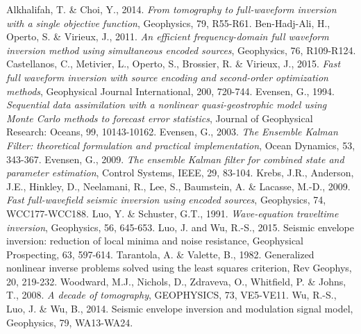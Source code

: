 \documentclass[mreferee]{gji}
\begin{document}
\begin{thebibliography}{}
   Alkhalifah, T. \& Choi, Y., 2014. \textit{From tomography to full-waveform inversion with a single objective function}, Geophysics, 79, R55-R61.
   Ben-Hadj-Ali, H., Operto, S. \& Virieux, J., 2011. \textit{An efficient frequency-domain full waveform inversion method using simultaneous encoded sources}, Geophysics, 76, R109-R124.
    Castellanos, C., Metivier, L., Operto, S., Brossier, R. \& Virieux, J., 2015. \textit{Fast full waveform inversion with source encoding and second-order optimization methods}, Geophysical Journal International, 200, 720-744. 
    Evensen, G., 1994. \textit{Sequential data assimilation with a nonlinear quasi-geostrophic model using Monte Carlo methods to forecast error statistics}, Journal of Geophysical Research: Oceans, 99, 10143-10162.
   Evensen, G., 2003. \textit{The Ensemble Kalman Filter: theoretical formulation and practical implementation}, Ocean Dynamics, 53, 343-367.
   Evensen, G., 2009. \textit{The ensemble Kalman filter for combined state and parameter estimation}, Control Systems, IEEE, 29, 83-104.
   Krebs, J.R., Anderson, J.E., Hinkley, D., Neelamani, R., Lee, S., Baumstein, A. \& Lacasse, M.-D., 2009. \textit{Fast full-wavefield seismic inversion using encoded sources}, Geophysics, 74, WCC177-WCC188.
   Luo, Y. \& Schuster, G.T., 1991. \textit{Wave-equation traveltime inversion}, Geophysics, 56, 645-653.
 Luo, J. and Wu, R.-S., 2015. Seismic envelope inversion: reduction of local minima and noise resistance, Geophysical Prospecting, 63, 597-614.
 Tarantola, A. \& Valette, B., 1982. Generalized nonlinear inverse problems solved using the least squares criterion, Rev Geophys, 20, 219-232.
 Woodward, M.J., Nichols, D., Zdraveva, O., Whitfield, P. \& Johns, T., 2008. \textit{A decade of tomography}, GEOPHYSICS, 73, VE5-VE11.
 Wu, R.-S., Luo, J. \& Wu, B., 2014. Seismic envelope inversion and modulation signal model, Geophysics, 79, WA13-WA24.

\end{thebibliography}
\end{document}
